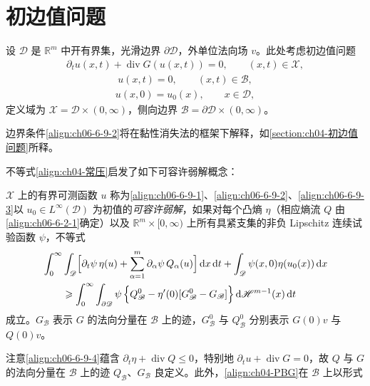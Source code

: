 \documentclass[../../main.tex]{subfiles}
\begin{document}
\section{初边值问题}\label{section:ch06-初边值问题}

设 $\mathscr{D}$ 是 $\mathbb{R}^{m}$ 中开有界集，光滑边界 $\partial\mathscr{D}$，外单位法向场 $v$。此处考虑初边值问题
\begin{align}
\partial_{t}u(x,t)+\operatorname{div}G(u(x,t))=0,\qquad (x,t)\in\mathscr{X},
\label{align:ch06-6-9-1}
\end{align}
\begin{align}
u(x,t)=0,\qquad (x,t)\in\mathscr{B},
\label{align:ch06-6-9-2}
\end{align}
\begin{align}
u(x,0)=u_{0}(x),\qquad x\in\mathscr{D},
\label{align:ch06-6-9-3}
\end{align}
定义域为 $\mathscr{X}=\mathscr{D}\times(0,\infty)$，侧向边界 $\mathscr{B}=\partial\mathscr{D}\times(0,\infty)$。

边界条件\eqref{align:ch06-6-9-2}将在黏性消失法的框架下解释，如\cref{section:ch04-初边值问题}所释。

不等式\eqref{align:ch04-常压}启发了如下可容许弱解概念：


\begin{definition}\label{definition:ch06-6-9-1}
$\mathscr{X}$ 上的有界可测函数 $u$ 称为\eqref{align:ch06-6-9-1}、\eqref{align:ch06-6-9-2}、\eqref{align:ch06-6-9-3}以 $u_{0}\in L^{\infty}(\mathscr{D})$ 为初值的\emph{可容许弱解}，如果对每个凸熵 $\eta$（相应熵流 $Q$ 由\eqref{align:ch06-6-2-1}确定）以及 $\mathbb{R}^{m}\times[0,\infty)$ 上所有具紧支集的非负 Lipschitz 连续试验函数 $\psi$，不等式
\begin{align}
&\int_{0}^{\infty}\int_{\mathscr{D}}\Bigl{[}\partial_{t}\psi\,\eta(u)+\sum_{\alpha=1}^{m}\partial_{\alpha}\psi\,Q_{\alpha}(u)\Bigr{]}\,\mathrm{d}x\,\mathrm{d}t+\int_{\mathscr{D}}\psi(x,0)\eta(u_{0}(x))\,\mathrm{d}x\notag\\
&\qquad\geqslant\int_{0}^{\infty}\int_{\partial\mathscr{D}}\psi\,\Bigl{\{}Q_{\mathscr{B}}^{0}-\eta^{\prime}(0)[G_{\mathscr{B}}^{0}-G_{\mathscr{B}}]\Bigr{\}}\,\mathrm{d}\mathscr{H}^{m-1}(x)\,\mathrm{d}t
\label{align:ch06-6-9-4}
\end{align}
成立。$G_{\mathscr{B}}$ 表示 $G$ 的法向分量在 $\mathscr{B}$ 上的迹，$G_{\mathscr{B}}^{0}$ 与 $Q_{\mathscr{B}}^{0}$ 分别表示 $G(0)v$ 与 $Q(0)v$。
\end{definition}

注意\eqref{align:ch06-6-9-4}蕴含 $\partial_{t}\eta+\operatorname{div}Q\leqslant 0$，特别地 $\partial_{t}u+\operatorname{div}G=0$，故 $Q$ 与 $G$ 的法向分量在 $\mathscr{B}$ 上的迹 $Q_{\mathscr{B}}$、$G_{\mathscr{B}}$ 良定义。此外，\eqref{align:ch04-PBG}在 $\mathscr{B}$ 上以形式
\end{document}
